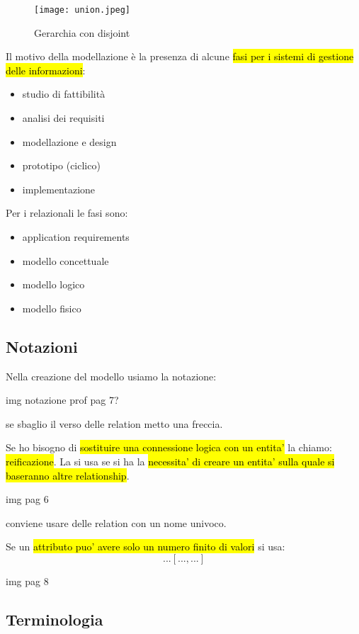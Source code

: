 \begin{figure}[H]
\centering
\texttt{[image: union.jpeg]}
\caption{Gerarchia con disjoint} 
\label{gerardisg}
\end{figure}



Il motivo della modellazione è la presenza di alcune \hl{fasi per i sistemi di gestione delle informazioni}:

\begin{itemize}
	\item studio di fattibilità
	\item analisi dei requisiti
	\item modellazione e design
	\item prototipo (ciclico)
	\item implementazione
\end{itemize}


Per i relazionali le fasi sono:

\begin{itemize}
	\item application requirements
	\item modello concettuale
	\item modello logico
	\item modello fisico
\end{itemize}


\subsection{Notazioni}

Nella creazione del modello usiamo la notazione:


img notazione prof pag 7?


se sbaglio il verso delle relation metto una freccia.


Se ho bisogno di \hl{sostituire una connessione logica con un entita'} la chiamo: \hl{reificazione}. La si usa se si ha la \hl{necessita' di creare un entita' sulla quale si baseranno altre relationship}.


img pag 6


conviene usare delle relation con un nome univoco.

Se un \hl{attributo puo' avere solo un numero finito di valori} si usa: $$...[... , ...]$$


img pag 8


\subsection{Terminologia}


